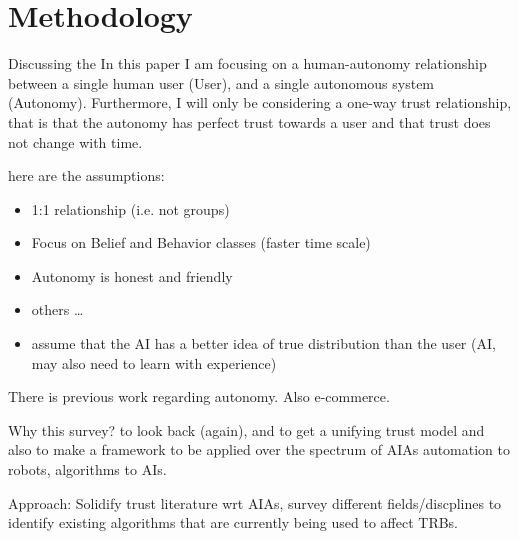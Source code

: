 \section{Methodology} \label{sec:methodology}
    Discussing the 
    In this paper I am focusing on a human-autonomy relationship between a single human user (User), and a single autonomous system (Autonomy). Furthermore, I will only be considering a one-way trust relationship, that is that the autonomy has perfect trust towards a user and that trust does not change with time. 

    here are the assumptions:

    \begin{itemize}
        \item 1:1 relationship (i.e. not groups)
        \item Focus on Belief and Behavior classes (faster time scale)
        \item Autonomy is honest and friendly
        \item others \ldots
        \item assume that the AI has a better idea of true distribution than the user (AI, may also need to learn with experience)
    \end{itemize}

    There is previous work regarding autonomy. Also e-commerce.

    Why this survey? to look back (again), and to get a unifying trust model and also to make a framework to be applied over the spectrum of  AIAs automation to robots, algorithms to AIs.

    Approach: Solidify trust literature wrt AIAs, survey different fields/discplines to identify existing algorithms that are currently being used to affect TRBs.
